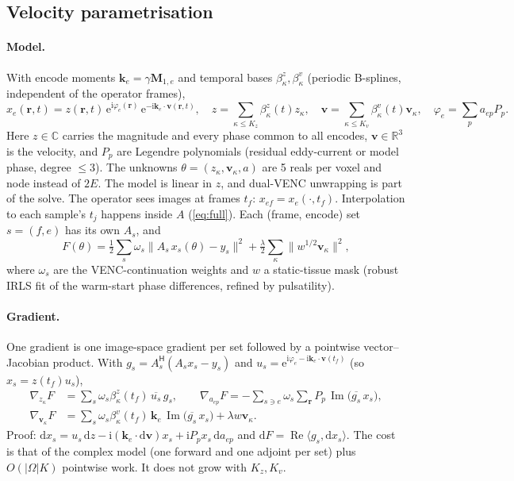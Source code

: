 \documentclass[11pt]{article}
\theoremstyle{remark}
\newcommand{\rr}{\bm r}
\newcommand{\ii}{\mathrm i}
\newcommand{\ee}{\mathrm e}
\newcommand{\dd}{\mathrm d}
\newcommand{\herm}{\mathsf H}
\newcommand{\CC}{\mathbb C}
\newcommand{\RR}{\mathbb R}
\newcommand{\Imag}{\operatorname{Im}}
\newcommand{\Real}{\operatorname{Re}}
\begin{document}
\subsection{Velocity parametrisation}
\label{sec:velmodel}

\paragraph{Model.} With encode moments $\bm k_e=\gamma\bm M_{1,e}$ and temporal bases $\beta^z_\kappa,\beta^v_\kappa$ (periodic B-splines, independent of the operator frames),
\begin{equation}
  x_e(\rr,t)=z(\rr,t)\,\ee^{\ii\varphi_e(\rr)}\,\ee^{-\ii\bm k_e\cdot\bm v(\rr,t)},\quad
  z=\sum_{\kappa\le K_z}\beta^z_\kappa(t)z_\kappa,\quad
  \bm v=\sum_{\kappa\le K_v}\beta^v_\kappa(t)\bm v_\kappa,\quad
  \varphi_e=\sum_pa_{ep}P_p .
  \label{eq:vmodel}
\end{equation}
Here $z\in\CC$ carries the magnitude and every phase common to all encodes, $\bm v\in\RR^3$ is the velocity, and $P_p$ are Legendre polynomials (residual eddy-current or model phase, degree $\le3$).
The unknowns $\theta=(z_\kappa,\bm v_\kappa,a)$ are 5 reals per voxel and node instead of $2E$. The model is linear in $z$, and dual-VENC unwrapping is part of the solve.
The operator sees images at frames $t_f$: $x_{ef}=x_e(\cdot,t_f)$. Interpolation to each sample's $t_j$ happens inside $A$ (\cref{eq:full}). Each (frame, encode) set $s=(f,e)$ has its own $A_s$, and
\begin{equation}
  F(\theta)=\tfrac12\sum_s\omega_s\bigl\|A_s\,x_{s}(\theta)-y_s\bigr\|^2+\tfrac\lambda2\sum_\kappa\bigl\|w^{1/2}\bm v_\kappa\bigr\|^2,
\end{equation}
where $\omega_s$ are the VENC-continuation weights and $w$ a static-tissue mask (robust IRLS fit of the warm-start phase differences, refined by pulsatility).

\paragraph{Gradient.} One gradient is one image-space gradient per set followed by a pointwise vector--Jacobian product. With $g_s=A_s^\herm(A_sx_s-y_s)$ and $u_{s}=\ee^{\ii\varphi_e-\ii\bm k_e\cdot\bm v(t_f)}$ (so $x_s=z(t_f)u_s$),
\begin{equation}
  \begin{aligned}
  \nabla_{z_\kappa}F&=\sum_s\omega_s\beta^z_\kappa(t_f)\,\overline{u_s}\,g_s,\qquad
  \nabla_{a_{ep}}F=-\sum_{s\ni e}\omega_s\sum_{\rr}P_p\,\Imag\bigl(\overline{g_s}\,x_s\bigr),\\
  \nabla_{\bm v_\kappa}F&=\sum_s\omega_s\beta^v_\kappa(t_f)\,\bm k_e\,\Imag\bigl(\overline{g_s}\,x_s\bigr)+\lambda w\bm v_\kappa .
  \end{aligned}
  \label{eq:vgrad}
\end{equation}
Proof: $\dd x_s=u_s\,\dd z-\ii(\bm k_e\cdot\dd\bm v)x_s+\ii P_p x_s\,\dd a_{ep}$ and $\dd F=\Real\langle g_s,\dd x_s\rangle$.
The cost is that of the complex model (one forward and one adjoint per set) plus $O(|\Omega|K)$ pointwise work. It does not grow with $K_z,K_v$.
\end{document}
